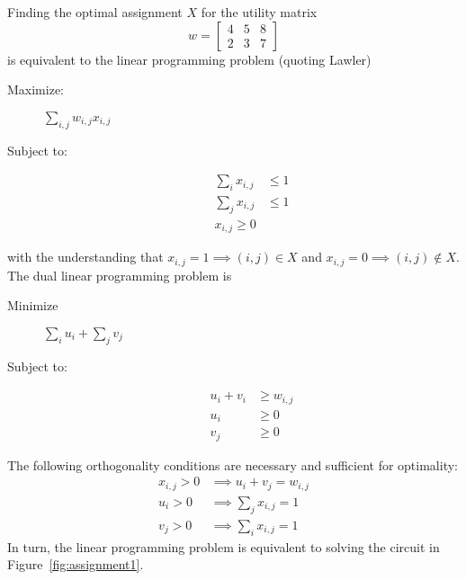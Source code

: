 \documentclass[12pt]{article}
\begin{document}
Finding the optimal assignment $X$ for the utility matrix
\begin{equation*}
  w =
  \begin{bmatrix}
    4 & 5 & 8 \\
    2 & 3 & 7
  \end{bmatrix}
\end{equation*}
is equivalent to the linear programming problem (quoting Lawler)
\begin{description}
\item[Maximize:] $\sum_{i,j} w_{i,j} x_{i,j}$
\item[Subject to:]
  \begin{align*}
    \sum_i x_{i,j} &\leq 1 \\
    \sum_j x_{i,j} &\leq 1 \\
    x_{i,j} \geq 0
  \end{align*}
\end{description}
with the understanding that $x_{i,j} = 1 \implies (i,j)\in X$ and
$x_{i,j} = 0 \implies (i,j)\notin X$.
The dual linear programming problem is
\begin{description}
\item[Minimize] $\sum_i u_i + \sum_j v_j$
\item[Subject to:]
  \begin{align*}
    u_i + v_i &\geq w_{i,j} \\
    u_i & \geq 0 \\
    v_j & \geq 0
  \end{align*}
\end{description}
The following orthogonality conditions are necessary and sufficient
for optimality:
\begin{align*}
  x_{i,j} > 0 & \implies u_i + v_j = w_{i,j}\\
  u_i > 0 & \implies \sum_j x_{i,j} = 1\\
  v_j > 0 & \implies \sum_i x_{i,j} = 1
\end{align*}
In turn, the linear programming problem is equivalent to solving the
circuit in Figure~\ref{fig:assignment1}.
\begin{figure*}
  \centering
  \caption{Circuit equivalent of assignment problem}
  \label{fig:assignment1}
\end{figure*}
\end{document}
